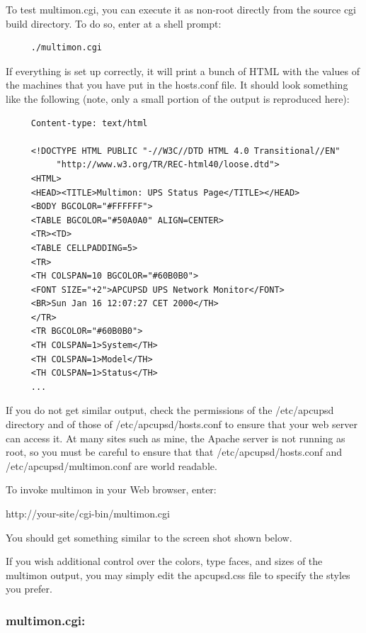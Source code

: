 {{{{{To test multimon.cgi, you can execute it as non-root directly from the source
cgi build directory. To do so, enter at a shell prompt: 

\footnotesize
\begin{verbatim}
     ./multimon.cgi
\end{verbatim}
\normalsize

If everything is set up correctly, it will print a bunch of HTML with the
values of the machines that you have put in the hosts.conf file. It should
look something like the following (note, only a small portion of the output is
reproduced here): 

\footnotesize
\begin{verbatim}
     Content-type: text/html
     
     <!DOCTYPE HTML PUBLIC "-//W3C//DTD HTML 4.0 Transitional//EN"
          "http://www.w3.org/TR/REC-html40/loose.dtd">
     <HTML>
     <HEAD><TITLE>Multimon: UPS Status Page</TITLE></HEAD>
     <BODY BGCOLOR="#FFFFFF">
     <TABLE BGCOLOR="#50A0A0" ALIGN=CENTER>
     <TR><TD>
     <TABLE CELLPADDING=5>
     <TR>
     <TH COLSPAN=10 BGCOLOR="#60B0B0">
     <FONT SIZE="+2">APCUPSD UPS Network Monitor</FONT>
     <BR>Sun Jan 16 12:07:27 CET 2000</TH>
     </TR>
     <TR BGCOLOR="#60B0B0">
     <TH COLSPAN=1>System</TH>
     <TH COLSPAN=1>Model</TH>
     <TH COLSPAN=1>Status</TH>
     ...
\end{verbatim}
\normalsize

If you do not get similar output, check the permissions of the /etc/apcupsd
directory and of those of /etc/apcupsd/hosts.conf to ensure that your web
server can access it. At many sites such as mine, the Apache server is not
running as root, so you must be careful to ensure that that
/etc/apcupsd/hosts.conf and /etc/apcupsd/multimon.conf are world readable.  

To invoke multimon in your Web browser, enter:  

http://\lt{}your-site\gt{}/cgi-bin/multimon.cgi  

You should get something similar to the screen shot shown below.  

If you wish additional control over the colors, type faces, and sizes of the
multimon output, you may simply edit the apcupsd.css file to specify the styles 
you prefer.

\label{multimon_005fcgi}

\subsubsection*{multimon.cgi:}

}}}}}
